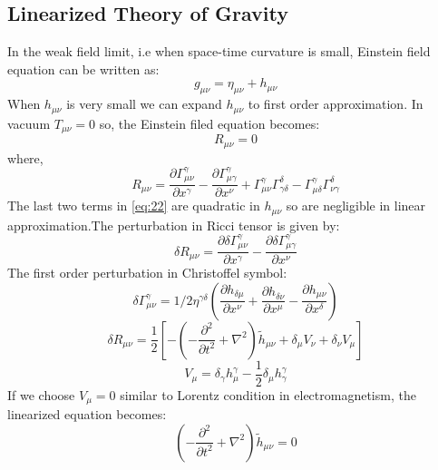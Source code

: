\documentclass{ttuthes2007}
\begin{document}
\subsection{Linearized Theory of Gravity}
	In the weak field limit, i.e when space-time curvature is small,
Einstein field equation can be written as:
\begin{equation} \label{eq:23}
g_{\mu \nu}= \eta_{\mu \nu} + h_{\mu \nu}
\end{equation}
When $h_{\mu \nu}$ is very small we can expand $h_{\mu \nu}$ to first order
approximation. 
	In vacuum $T_{\mu \nu} =0$ so, the Einstein filed equation becomes:
\begin{equation}\label{eq:21}
R_{\mu \nu} =0
\end{equation}
where,
\begin{equation} \label{eq:22}
R_{\mu \nu} = \frac{\partial \Gamma ^\gamma _{\mu \nu}}{\partial x^\gamma} -
\frac{\partial \Gamma ^\gamma _{\mu \gamma}}{\partial x^\nu}+ \Gamma ^\gamma
_{\mu \nu}\Gamma ^\delta _{\gamma \delta}-\Gamma ^\gamma _{\mu \delta}\Gamma
^\delta_{\nu \gamma}
\end{equation}
The last two terms in \ref{eq:22} are quadratic in $h_{\mu \nu}$ so are negligible
in linear approximation.The perturbation in Ricci tensor is given by:
\begin{equation} \label{eq:23}
\delta R_{\mu \nu} = \frac{\partial \delta \Gamma ^\gamma _{\mu \nu}}{\partial 
x^\gamma} - \frac{\partial \delta \Gamma ^\gamma _{\mu \gamma}}{\partial x^\nu}
\end{equation}
The first order perturbation in Christoffel symbol:
\begin{equation} \label{eq:24}
\delta \Gamma ^\gamma _{\mu \nu}= 1/2 \eta^{\gamma \delta}\left(\frac{\partial
h_{\delta \mu }}{\partial x^\nu} + \frac{\partial h_{\delta \nu }}{\partial
x^\mu} -\frac{\partial  h_{\mu \nu }}{\partial x^\delta}\right)
\end{equation}
\begin{equation} \label{eq:25}
\delta R_{\mu \nu} = \frac{1}{2}\left[ -\left(-\frac{\partial^2}{\partial
t^2}+\nabla ^2\right)\tilde h_{\mu\nu} + \delta_\mu V_\nu + \delta_\nu V_\mu
\right]
\end{equation}
\begin{equation} \label{eq:26}
V_\mu = \delta_\gamma h^\gamma_\mu - \frac{1}{2}\delta_\mu h^\gamma_\gamma
\end{equation}
	If we choose $V_\mu=0$ similar to Lorentz condition in electromagnetism,
 the linearized equation becomes:
\begin{equation} \label{eq:27}
\left(-\frac{\partial^2}{\partial t^2}+\nabla ^2\right)\tilde h_{\mu\nu} =0 
\end{equation}
\end{document}
